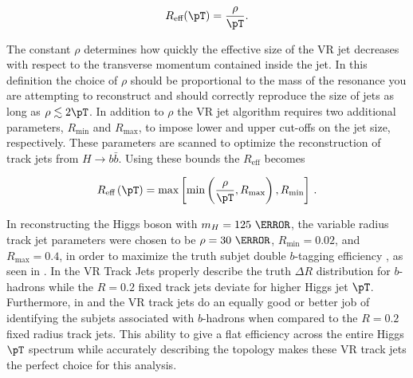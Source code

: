 \[ R_{\text{eff}}(\pT) = \frac{\rho}{\pT}. \]

The constant $\rho$ determines how quickly the effective size of the VR jet
decreases with respect to the transverse momentum contained inside the jet.  In
this definition the choice of $\rho$ should be proportional to the mass of the
resonance you are attempting to reconstruct and should correctly reproduce the
size of jets as long as $\rho \lesssim 2\pT$. In addition to $\rho$ the VR jet
algorithm requires two additional parameters, $R_{\text{min}}$ and
$R_{\text{max}}$, to impose lower and upper cut-offs on the jet size,
respectively.  These parameters are scanned to optimize the reconstruction of
track jets from $H \rightarrow b\bar{b}$. Using these bounds the
$R_{\text{eff}}$ becomes 

\[
 R_{\text{eff}} \left(\pT\right)= \text{max}\left[\text{min}\left(\frac{\rho}{\pT},R_{\text{max}}\right),R_{\text{min}}\right]\,.
\]

In reconstructing the Higgs boson with $m_{H} = 125~\GeV$, the variable radius
track jet parameters were chosen to be $\rho = 30~\GeV$, $R_{\text{min}}=0.02$,
and $R_{\text{max}}=0.4$, in order to maximize the truth subjet double
$b$-tagging efficiency \cite{ATL-PHYS-PUB-2017-010}, as seen in
.  In  the VR Track Jets
properly describe the truth $\Delta R$ distribution for $b$-hadrons while the
$R=0.2$ fixed track jets deviate for higher Higgs jet $\pT$.  Furthermore, in
 and  the VR track
jets do an equally good or better job of identifying the subjets associated
with $b$-hadrons when compared to the $R=0.2$ fixed radius track jets.  This
ability to give a flat efficiency across the entire Higgs $\pT$ spectrum while
accurately describing the topology makes these VR track jets the perfect choice
for this analysis.

